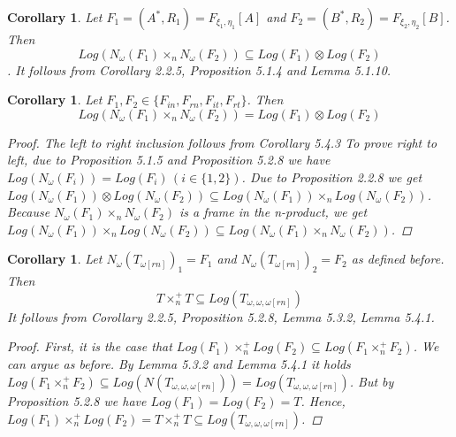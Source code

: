 \documentclass[12pt, a4paper]{scrartcl}
\newtheorem{corollary}[definition]{Corollary}
\begin{document}
    \begin{corollary}
        Let $F_1 = (A^*,R_1) = F_{\xi_1, \eta_1}[A]$ and $F_2 = (B^*,R_2) = F_{\xi_2, \eta_2}[B]$. Then 
        $$Log(N_\omega(F_1) \times_n N_\omega(F_2))  \subseteq Log(F_1) \otimes Log(F_2)$$.
        It follows from Corollary 2.2.5, Proposition 5.1.4 and Lemma 5.1.10.
    \end{corollary}

    \begin{corollary}
        Let $F_1, F_2 \in \{F_{in}, F_{rn}, F_{it}, F_{rt}\}$. Then 
        $$Log(N_\omega(F_1) \times_nN_\omega(F_2)) = Log(F_1) \otimes Log(F_2)$$

        \begin{proof}
            The left to right inclusion follows from Corollary 5.4.3 \newline \newline
            To prove right to left, due to Proposition 5.1.5 and Proposition 5.2.8 we have $Log(N_\omega(F_i)) = Log(F_i) \, (i \in \{1,2\})$.
            Due to Proposition 2.2.8 we get $Log(N_\omega(F_1)) \otimes Log(N_\omega(F_2)) \subseteq Log(N_\omega(F_1)) \times_n Log(N_\omega(F_2))$. 
            Because $N_\omega(F_1)\times_n N_\omega(F_2)$ is a frame in the n-product, we get
            $Log(N_\omega(F_1)) \times_n Log(N_\omega(F_2)) \subseteq Log(N_\omega(F_1)\times_n N_\omega(F_2))$.

        \end{proof}

    \end{corollary}

    \begin{corollary}
        Let $N_\omega(T_{\omega[rn]})_1 = F_1$ and $N_\omega(T_{\omega[rn]})_2 = F_2$ as defined before. Then 
        $$T \times^+_n T \subseteq Log(T_{\omega,\omega,\omega[rn]})$$
        It follows from Corollary 2.2.5, Proposition 5.2.8, Lemma 5.3.2, Lemma 5.4.1.

        \begin{proof}
            First, it is the case that $Log(F_1) \times^+_n Log(F_2) \subseteq Log(F_1 \times^+_n F_2)$. We can argue as before.
            By Lemma 5.3.2 and Lemma 5.4.1 it holds $Log(F_1 \times^+_n F_2) \subseteq Log(N(T_{\omega,\omega,\omega[rn]})) = Log(T_{\omega,\omega,\omega[rn]})$.
            But by Proposition 5.2.8 we have $Log(F_1) = Log(F_2) = T$. Hence, $Log(F_1) \times^+_n Log(F_2) = T \times^+_n T \subseteq Log(T_{\omega,\omega,\omega[rn]})$.
        \end{proof}

    \end{corollary}
\end{document}
